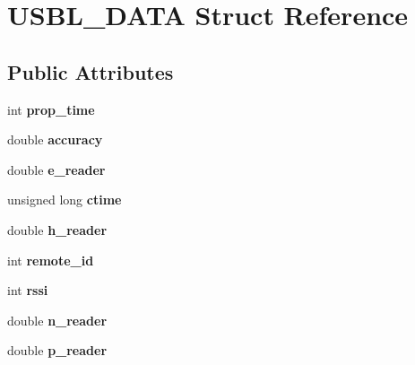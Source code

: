 \hypertarget{structUSBL__DATA}{}\section{U\+S\+B\+L\+\_\+\+D\+A\+TA Struct Reference}
\label{structUSBL__DATA}
\subsection*{Public Attributes}
\begin{DoxyCompactItemize}
\item 
\mbox{\label{structUSBL__DATA_a18673df92f4c80a326016b28798f6dfc}} 
int {\bfseries prop\+\_\+time}
\item 
\mbox{\label{structUSBL__DATA_adb9cabe0a315feeb2f26dab5fa8d8c20}} 
double {\bfseries accuracy}
\item 
\mbox{\label{structUSBL__DATA_a151e339829d8d6b8caa82c88f983c44d}} 
double {\bfseries e\+\_\+reader}
\item 
\mbox{\label{structUSBL__DATA_adf15833806125118c347644d01aa08fd}} 
unsigned long {\bfseries ctime}
\item 
\mbox{\label{structUSBL__DATA_aaf5c26e66fb2c53eda8639cf9865708d}} 
double {\bfseries h\+\_\+reader}
\item 
\mbox{\label{structUSBL__DATA_ab54b630ba7565b0eb7008283ea064e1b}} 
int {\bfseries remote\+\_\+id}
\item 
\mbox{\label{structUSBL__DATA_ab871395e915e4278906a3a2f4348fb94}} 
int {\bfseries rssi}
\item 
\mbox{\label{structUSBL__DATA_abf1b91b10f868316677fe3170a11e2c1}} 
double {\bfseries n\+\_\+reader}
\item 
\mbox{\label{structUSBL__DATA_a7a6b598b2c48105a5361c0eb16113c5a}} 
double {\bfseries p\+\_\+reader}
\item 
\mbox{\label{structUSBL__DATA_a35000c42568d33ae46ec4e9923f2738d}} 

\end{DoxyCompactItemize}
